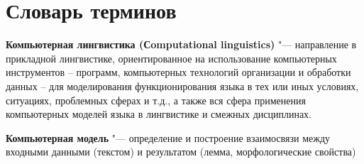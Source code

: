 \chapter*{Словарь терминов}             %

\textbf{Компьютерная лингвистика (Сomputational linguistics)} "--- направление в прикладной лингвистике, ориентированное на использование компьютерных инструментов – программ, компьютерных технологий организации и обработки данных – для моделирования функционирования языка в тех или иных условиях, ситуациях, проблемных сферах и т.д., а также вся сфера применения компьютерных моделей языка в лингвистике и смежных дисциплинах.

\textbf{Компьютерная модель} "--- определение и построение взаимосвязи между входными данными (текстом) и результатом (лемма, морфологические свойства)

